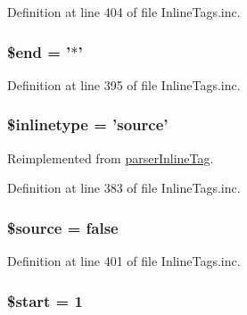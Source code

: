 \-Definition at line 404 of file \-Inline\-Tags.\-inc.

\hypertarget{classparser_source_inline_tag_ac2040b96cd66d4d79b1d9fe0027d2f9b}{
\subsubsection[{\$end}]{\setlength{\rightskip}{0pt plus 5cm}\$end = '$\ast$'}}\label{classparser_source_inline_tag_ac2040b96cd66d4d79b1d9fe0027d2f9b}


\-Definition at line 395 of file \-Inline\-Tags.\-inc.

\hypertarget{classparser_source_inline_tag_a7583c1b3912b7afa3f038eb353a6ad97}{
\subsubsection[{\$inlinetype}]{\setlength{\rightskip}{0pt plus 5cm}\$inlinetype = 'source'}}\label{classparser_source_inline_tag_a7583c1b3912b7afa3f038eb353a6ad97}


\-Reimplemented from \hyperlink{classparser_inline_tag_a7583c1b3912b7afa3f038eb353a6ad97}{parser\-Inline\-Tag}.



\-Definition at line 383 of file \-Inline\-Tags.\-inc.

\hypertarget{classparser_source_inline_tag_a99a2b085f0a29bd5d799fdcbb63d261b}{
\subsubsection[{\$source}]{\setlength{\rightskip}{0pt plus 5cm}\$source = false}}\label{classparser_source_inline_tag_a99a2b085f0a29bd5d799fdcbb63d261b}


\-Definition at line 401 of file \-Inline\-Tags.\-inc.

\hypertarget{classparser_source_inline_tag_a50a00e7de77365e00b117e73aa82fb9b}{
\subsubsection[{\$start}]{\setlength{\rightskip}{0pt plus 5cm}\$start = 1}}\label{classparser_source_inline_tag_a50a00e7de77365e00b117e73aa82fb9b}


